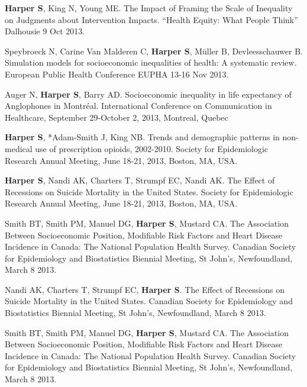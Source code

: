 \documentclass[
  letterpaper,
  DIV=11,
  numbers=noendperiod]{scrartcl}
\begin{document}
\begin{etaremune}
\item   \textbf{Harper S}, King N, Young ME. The Impact of Framing the Scale of Inequality on Judgments about Intervention Impacts. “Health Equity: What People Think” Dalhousie 9 Oct 2013. 

\item   Speybroeck N, Carine Van Malderen C, \textbf{Harper S}, Müller B, Devleesschauwer B. Simulation models for socioeconomic inequalities of health: A systematic review. European Public Health Conference EUPHA 13-16 Nov 2013.

\item   Auger N, \textbf{Harper S}, Barry AD. Socioeconomic inequality in life expectancy of Anglophones in Montréal. International Conference on Communication in Healthcare, September 29-October 2, 2013, Montreal, Quebec 

\item   \textbf{Harper S}, *Adam-Smith J, King NB. Trends and demographic patterns in non-medical use of prescription opioids, 2002-2010. Society for Epidemiologic Research Annual Meeting, June 18-21, 2013, Boston, MA, USA.

\item   \textbf{Harper S}, Nandi AK, Charters T, Strumpf EC, Nandi AK. The Effect of Recessions on Suicide Mortality in the United States. Society for Epidemiologic Research Annual Meeting, June 18-21, 2013, Boston, MA, USA.

\item   Smith BT, Smith PM, Manuel DG, \textbf{Harper S}, Mustard CA. The Association Between Socioeconomic Position, Modifiable Risk Factors and Heart Disease Incidence in Canada: The National Population Health Survey. Canadian Society for Epidemiology and Biostatistics Biennial Meeting, St John’s, Newfoundland, March 8 2013.

\item   Nandi AK, Charters T, Strumpf EC, \textbf{Harper S}. The Effect of Recessions on Suicide Mortality in the United States. Canadian Society for Epidemiology and Biostatistics Biennial Meeting, St John’s, Newfoundland, March 8 2013.

\item   Smith BT, Smith PM, Manuel DG, \textbf{Harper S}, Mustard CA. The Association Between Socioeconomic Position, Modifiable Risk Factors and Heart Disease Incidence in Canada: The National Population Health Survey. Canadian Society for Epidemiology and Biostatistics Biennial Meeting, St John’s, Newfoundland, March 8 2013.


\end{etaremune}
\end{document}
